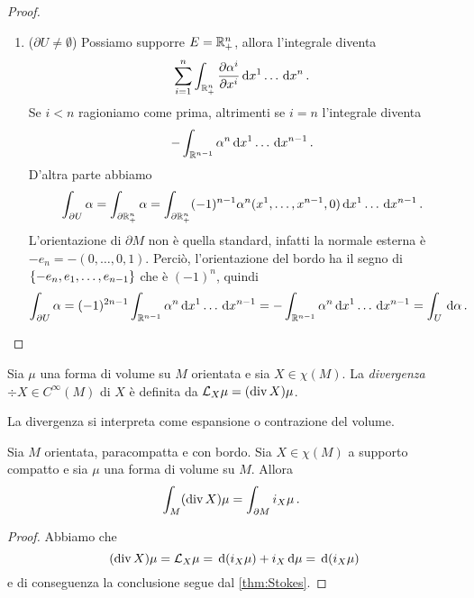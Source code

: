 \begin{proof}
\begin{enumerate}
		\item ($\partial U \not = \emptyset$) Possiamo supporre $E=\R^n_+$, allora l'integrale diventa
		\begin{equation*}
			\sum_{i=1}^n \int_{\R^n_+} \DerParz{\alpha^i}{x^i} \seqa {\de x}{n}{} \punto
		\end{equation*}
		Se $i<n$ ragioniamo come prima, altrimenti se $i=n$ l'integrale diventa
		\begin{equation*}
			- \int_{\R^{n-1}} \alpha^n \seqa {\de x}{n-1}{} \punto
		\end{equation*}
		D'altra parte abbiamo
		\begin{equation*}
			\int_{\partial U}\alpha = \int_{\partial \R^n_+} \alpha = \int_{\partial \R^n_+} (-1)^{n-1} \alpha^n(\seqa x{n-1}, ,0) \seqa {\de x}{n-1}{} \punto
		\end{equation*}
		L'orientazione di $\partial M$ non è quella standard, infatti la normale esterna è $-e_n = -(0,\ldots,0,1)$. Perciò, l'orientazione del bordo ha il segno di $\{-e_n, \seqb e{n-1},\}$ che è  $(-1)^n$, quindi
		\begin{equation*}
			\int_{\partial U}\alpha = (-1)^{2n-1} \int_{\R^{n-1}} \alpha^n \seqa{\de x}{n-1}{} = - \int_{\R^{n-1}} \alpha^n \seqa {\de x}{n-1}{} = \int_U\de \alpha \punto
		\end{equation*}


	\end{enumerate}


\end{proof}


\begin{definition} 
	Sia $\mu$ una forma di volume su $M$ orientata e sia $X\in \chi(M)$. La \emph{divergenza} $\div X \in C^\infty(M)$ di $X$ è definita da $\Lie_X\mu = (\div X)\mu$.
\end{definition}

La divergenza si interpreta come espansione o contrazione del volume.

\begin{theorem} [Gauss]\label{thm:Gauss} 
	Sia $M$ orientata, paracompatta e con bordo. Sia $X\in\chi(M)$ a supporto compatto e sia $\mu$ una forma di volume su $M$. Allora
	\begin{equation*}
		\int_M (\div X) \mu = \int_{\partial M} i_X \mu \punto
	\end{equation*}
\end{theorem}
\begin{proof}
	Abbiamo che
	\begin{equation*}
		(\div X) \mu = \Lie_X \mu = \de (i_X \mu) + i_X \de \mu = \de (i_X \mu) %
	\end{equation*}
	e di conseguenza la conclusione segue dal \cref{thm:Stokes}.
\end{proof}


